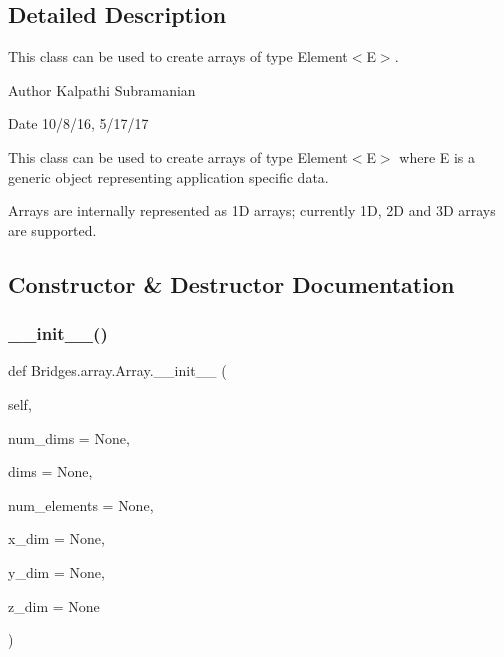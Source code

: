 \subsection{Detailed Description}
This class can be used to create arrays of type Element$<$\+E$>$. 

\begin{DoxyAuthor}{Author}
Kalpathi Subramanian
\end{DoxyAuthor}
\begin{DoxyDate}{Date}
10/8/16, 5/17/17
\end{DoxyDate}
This class can be used to create arrays of type Element$<$\+E$>$ where E is a generic object representing application specific data.

Arrays are internally represented as 1D arrays; currently 1D, 2D and 3D arrays are supported. 

\subsection{Constructor \& Destructor Documentation}
\mbox{\label{class_bridges_1_1array_1_1_array_a51bf3ede77b0b9090a15c6119d4b9a3e}} 
\subsubsection{\texorpdfstring{\+\_\+\+\_\+init\+\_\+\+\_\+()}{\_\_init\_\_()}}
{\footnotesize\ttfamily def Bridges.\+array.\+Array.\+\_\+\+\_\+init\+\_\+\+\_\+ (\begin{DoxyParamCaption}\item[{}]{self,  }\item[{}]{num\+\_\+dims = {\ttfamily None},  }\item[{}]{dims = {\ttfamily None},  }\item[{}]{num\+\_\+elements = {\ttfamily None},  }\item[{}]{x\+\_\+dim = {\ttfamily None},  }\item[{}]{y\+\_\+dim = {\ttfamily None},  }\item[{}]{z\+\_\+dim = {\ttfamily None} }\end{DoxyParamCaption})}



